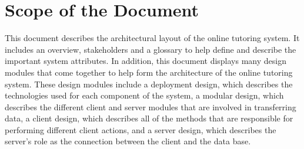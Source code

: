 \chapter{Scope of the Document}
This document describes the architectural layout of the online tutoring system. It includes an overview, stakeholders and a glossary to help define and describe the important system attributes. In addition, this document displays many design modules that come together to help form the architecture of the online tutoring system.  These design modules include a deployment design, which describes the technologies used for each component of the system, a  modular design, which describes the different client and server modules that are involved in transferring data, a client design, which describes all of the methods that are responsible for performing different client actions, and a server design, which describes the server's role as the connection between the client and the data base.     


